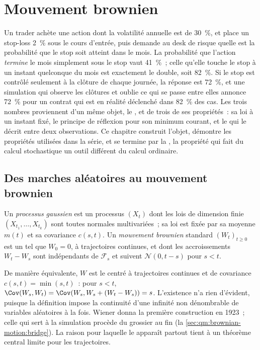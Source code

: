 \chapter{Mouvement brownien}\label{ch:qm:brownian-motion}

Un trader achète une action dont la volatilité annuelle est de 30~\%, et place un stop-loss 2~\% sous le
cours d'entrée, puis demande au desk de risque quelle est la probabilité que le stop soit atteint dans le mois. La
probabilité que l'action \emph{termine} le mois simplement sous le stop vaut 41~\%~; celle qu'elle
touche le stop à un instant quelconque du mois est exactement le double, soit 82~\%. Si le stop est
contrôlé seulement à la clôture de chaque journée, la réponse est 72~\%, et une simulation qui observe les
clôtures et oublie ce qui se passe entre elles annonce 72~\% pour un contrat qui est en réalité
déclenché dans 82~\% des cas. Les trois nombres proviennent d'un même objet, le , et
de trois de ses propriétés~: sa loi à un instant fixé, le principe de réflexion pour son
minimum courant, et le  qui le décrit entre deux observations. Ce
chapitre construit l'objet, démontre les propriétés utilisées dans la série, et se termine par la
, la propriété qui fait du calcul stochastique un outil différent du
calcul ordinaire.

\section{Des marches aléatoires au mouvement brownien}

\begin{definition}\label{def:qm:brownian-motion:bm}
Un \emph{processus gaussien} est un processus $(X_t)$ dont les lois de dimension finie
$(X_{t_1}, \dots, X_{t_k})$ sont toutes normales multivariées~; sa loi est fixée par sa moyenne
$m(t)$ et sa covariance $c(s,t)$. Un \emph{mouvement brownien} standard
$(W_t)_{t \ge 0}$ est un  tel que $W_0 = 0$, à trajectoires continues, et dont les accroissements
$W_t - W_s$ sont indépendants de $\mathcal F_s$ et suivent $\mathcal N(0, t - s)$ pour $s < t$.
\end{definition}

De manière équivalente, $W$ est le  centré à trajectoires continues et de covariance
$c(s,t) = \min(s,t)$~: pour $s < t$, $\Cov(W_s, W_t) = \Cov(W_s, W_s + (W_t - W_s)) = s$.
L'existence n'a rien d'évident, puisque la définition impose la continuité d'une infinité non dénombrable
de variables aléatoires à la fois. Wiener donna la première construction en 1923~; celle qui sert
à la simulation procède du grossier au fin (la \cref{sec:qm:brownian-motion:bridge}). La raison
pour laquelle le  apparaît partout tient à un théorème central limite pour les trajectoires.

